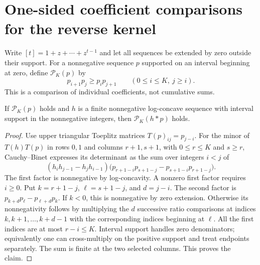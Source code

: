 \section{One-sided coefficient comparisons for the reverse kernel}
Write $[t]=1+z+\cdots+z^{t-1}$ and let all sequences be extended by zero
outside their support. For a nonnegative sequence $p$ supported on an
interval beginning at zero, define $\mathcal P_K(p)$ by
\[
 p_{i+1}p_j\ge p_i p_{j+1}\qquad(0\le i\le K,\ j\ge i).
\]
This is a comparison of individual coefficients, not cumulative sums.

\begin{lemma}
If $\mathcal P_K(p)$ holds and $h$ is a finite nonnegative log-concave
sequence with interval support in the nonnegative integers, then
$\mathcal P_K(h*p)$ holds.
\end{lemma}
\begin{proof}
Use upper triangular Toeplitz matrices $T(p)_{ij}=p_{j-i}$. For the
minor of $T(h)T(p)$ in rows $0,1$ and columns $r+1,s+1$, with
$0\le r\le K$ and $s\ge r$, Cauchy--Binet expresses its determinant as
the sum over integers $i<j$ of
\[
 (h_i h_{j-1}-h_j h_{i-1})
 \bigl(p_{r+1-i}p_{s+1-j}-p_{s+1-i}p_{r+1-j}\bigr).
\]
The first factor is nonnegative by log-concavity. A nonzero first
factor requires $i\ge0$. Put $k=r+1-j$, $\ell=s+1-j$, and $d=j-i$.
The second factor is $p_{k+d}p_\ell-p_{\ell+d}p_k$. If $k<0$, this is
nonnegative by zero extension. Otherwise its nonnegativity follows by
multiplying the $d$ successive ratio comparisons at indices
$k,k+1,\ldots,k+d-1$ with the corresponding indices beginning at
$\ell$. All the first indices are at most $r-i\le K$.
Interval support handles zero denominators; equivalently one can
cross-multiply on the positive support and treat endpoints separately.
The sum is finite at the two selected columns. This proves the claim.
\end{proof}


